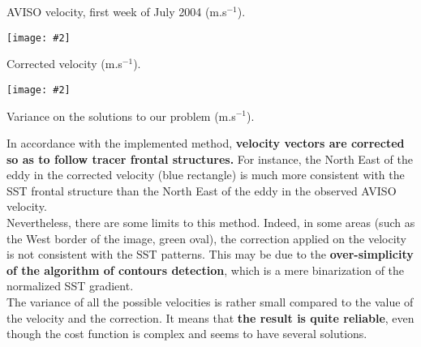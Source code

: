 \documentclass[portrait,a0,final]{a0poster}
\newenvironment{poster}{
  \begin{center}
  \begin{minipage}[c]{1.0\textwidth}
}{
  \end{minipage} 
  \end{center}
}
\newcommand{\myfig}[3][0]{
\begin{center}
  \vspace{0.10cm}
  \texttt{[image: \#2]}
\end{center}}
\begin{document}
\begin{poster}
\begin{center}
{{\begin{center}
{\begin{minipage}{0.32\textwidth}
          \small{\centerline{AVISO velocity, first week of July 2004 (m.s$^{-1}$).}}
        \end{minipage}
        \begin{minipage}{0.32\textwidth}
          \myfig{./pict/aviso_19904_med_eof_circle.eps}{0.8}
          \small{\centerline{Corrected velocity (m.s$^{-1}$).}}
        \end{minipage}
        \begin{minipage}{0.33\textwidth}
          \vspace{5mm}
          \myfig{./pict/aviso_norm19904_med_var_bin0.eps}{0.92}
          \small{\centerline{Variance on the solutions to our problem (m.s$^{-1}$).}}
        \end{minipage}
      }   
      \end{center}
      \vspace{1em}
       In accordance with the implemented method, \textcolor{mycyan}{ \bf velocity vectors are corrected so as to follow tracer frontal structures.}
       For instance, the North East of the eddy in the corrected velocity (blue rectangle) is much more consistent with the SST frontal structure than the North East of the eddy in the observed AVISO velocity. \\  
       Nevertheless, there are some limits to this method. 
      Indeed, in some areas (such as the West border of the image, green oval), the correction applied on the velocity is not consistent with the SST patterns. 
      This may be due to the \textcolor{mycyan}{ \bf over-simplicity of the algorithm of contours detection}, which is a mere binarization of the normalized SST gradient. \\ 
        The variance of all the possible velocities is rather small compared to the value of the velocity and the correction. 
       It means that \textcolor{mycyan}{ \bf the result is quite reliable}, even though the cost function is complex and seems to have several solutions. 
}}
\end{center}
\end{poster}
\end{document}
